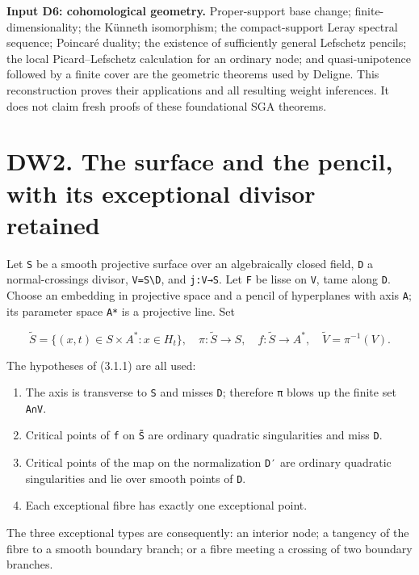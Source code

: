 \documentclass[
]{report}
\providecommand{\tightlist}{%
  \setlength{\itemsep}{0pt}\setlength{\parskip}{0pt}}
\begin{document}
\textbf{Input D6: cohomological geometry.} Proper-support base change;
finite-dimensionality; the Künneth isomorphism; the compact-support
Leray spectral sequence; Poincaré duality; the existence of sufficiently
general Lefschetz pencils; the local Picard--Lefschetz calculation for
an ordinary node; and quasi-unipotence followed by a finite cover are
the geometric theorems used by Deligne. This reconstruction proves their
applications and all resulting weight inferences. It does not claim
fresh proofs of these foundational SGA theorems.

\section{DW2. The surface and the pencil, with its exceptional divisor
retained}\label{dw2.-the-surface-and-the-pencil-with-its-exceptional-divisor-retained}

Let \texttt{S} be a smooth projective surface over an algebraically
closed field, \texttt{D} a normal-crossings divisor,
\texttt{V=S\textbackslash{}D}, and \texttt{j:V→S}. Let \texttt{F} be
lisse on \texttt{V}, tame along \texttt{D}. Choose an embedding in
projective space and a pencil of hyperplanes with axis \texttt{A}; its
parameter space \texttt{A*} is a projective line. Set

\[
\widetilde S=\{(x,t)\in S\times A^*:x\in H_t\},
\quad\pi:\widetilde S\to S,
\quad f:\widetilde S\to A^*,
\quad\widetilde V=\pi^{-1}(V).
\tag{DW2.1}
\]

The hypotheses of (3.1.1) are all used:

\begin{enumerate}
\def\labelenumi{\arabic{enumi}.}
\tightlist
\item
  The axis is transverse to \texttt{S} and misses \texttt{D}; therefore
  \texttt{π} blows up the finite set \texttt{A∩V}.
\item
  Critical points of \texttt{f} on \texttt{S̃} are ordinary quadratic
  singularities and miss \texttt{D}.
\item
  Critical points of the map on the normalization \texttt{D′} are
  ordinary quadratic singularities and lie over smooth points of
  \texttt{D}.
\item
  Each exceptional fibre has exactly one exceptional point.
\end{enumerate}

The three exceptional types are consequently: an interior node; a
tangency of the fibre to a smooth boundary branch; or a fibre meeting a
crossing of two boundary branches.
\end{document}
